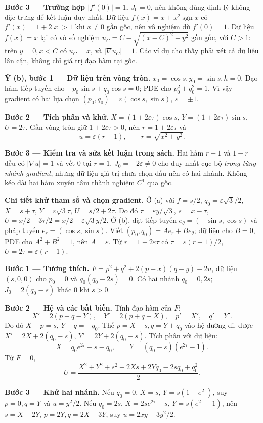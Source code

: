 \textbf{Bước 3 — Trường hợp $|f'(0)|=1$.} $J_0=0$, nên không dùng định lý không đặc trưng để kết luận duy nhất. Dữ liệu $f(x)=x+x^2\operatorname{sgn}x$ có $f'(x)=1+2|x|>1$ khi $x\ne0$ gần gốc, nên vô nghiệm dù $f'(0)=1$. Dữ liệu $f(x)=x$ lại có vô số nghiệm $u_C=C-\sqrt{(x-C)^2+y^2}$ gần gốc, với $C>1$: trên $y=0,x<C$ có $u_C=x$, và $|\nabla u_C|=1$. Các ví dụ cho thấy phải xét cả dữ liệu lân cận, không chỉ giá trị đạo hàm tại gốc.

\textbf{Ý (b), bước 1 — Dữ liệu trên vòng tròn.} $x_0=\cos s,y_0=\sin s,h=0$. Đạo hàm tiếp tuyến cho $-p_0\sin s+q_0\cos s=0$; PDE cho $p_0^2+q_0^2=1$. Vì vậy gradient có hai lựa chọn $(p_0,q_0)=\varepsilon(\cos s,\sin s)$, $\varepsilon=\pm1$.

\textbf{Bước 2 — Tích phân và khử.} $X=(1+2\varepsilon\tau)\cos s$, $Y=(1+2\varepsilon\tau)\sin s$, $U=2\tau$. Gần vòng tròn giữ $1+2\varepsilon\tau>0$, nên $r=1+2\varepsilon\tau$ và
\[u=\varepsilon(r-1),\qquad r=\sqrt{x^2+y^2}.\]

\textbf{Bước 3 — Kiểm tra và sửa kết luận trong sách.} Hai hàm $r-1$ và $1-r$ đều có $|\nabla u|=1$ và vết 0 tại $r=1$. $J_0=-2\varepsilon\ne0$ cho duy nhất cục bộ \emph{trong từng nhánh gradient}, nhưng dữ liệu giá trị chưa chọn dấu nên có hai nhánh. Không kéo dài hai hàm xuyên tâm thành nghiệm $C^1$ qua gốc.

\textbf{Chi tiết khử tham số và chọn gradient.} Ở (a) với $f=s/2$, $q_0=\varepsilon\sqrt3/2$, $X=s+\tau$, $Y=\varepsilon\sqrt3\tau$, $U=s/2+2\tau$. Do đó $\tau=\varepsilon y/\sqrt3$, $s=x-\tau$, $U=x/2+3\tau/2=x/2+\varepsilon\sqrt3 y/2$. Ở (b), đặt tiếp tuyến $e_\theta=(-\sin s,\cos s)$ và pháp tuyến $e_r=(\cos s,\sin s)$. Viết $(p_0,q_0)=Ae_r+Be_\theta$; dữ liệu cho $B=0$, PDE cho $A^2+B^2=1$, nên $A=\varepsilon$. Từ $r=1+2\varepsilon\tau$ có $\tau=\varepsilon(r-1)/2$, $U=2\tau=\varepsilon(r-1)$.

\textbf{Bước 1 — Tương thích.} $F=p^2+q^2+2(p-x)(q-y)-2u$, dữ liệu $(s,0,0)$ cho $p_0=0$ và $q_0(q_0-2s)=0$. Có hai nhánh $q_0=0,2s$; $J_0=2(q_0-s)$ khác 0 khi $s>0$.

\textbf{Bước 2 — Hệ và các bất biến.} Tính đạo hàm của $F$:
\[X'=2(p+q-Y),\quad Y'=2(p+q-X),\quad p'=X',\quad q'=Y'.\]
Do đó $X-p=s$, $Y-q=-q_0$. Thế $p=X-s,q=Y+q_0$ vào hệ đường đi, được $X'=2X+2(q_0-s)$, $Y'=2Y+2(q_0-s)$. Tích phân với dữ liệu:
\[X=q_0e^{2\tau}+s-q_0,\qquad Y=(q_0-s)(e^{2\tau}-1).\]
Từ $F=0$,
\[U=\frac{X^2+Y^2+s^2-2Xs+2Yq_0-2sq_0+q_0^2}{2}.\]

\textbf{Bước 3 — Khử hai nhánh.} Nếu $q_0=0$, $X=s$, $Y=s(1-e^{2\tau})$, suy $p=0,q=Y$ và $u=y^2/2$. Nếu $q_0=2s$, $X=2se^{2\tau}-s$, $Y=s(e^{2\tau}-1)$, nên $s=X-2Y$, $p=2Y,q=2X-3Y$, suy $u=2xy-3y^2/2$.

